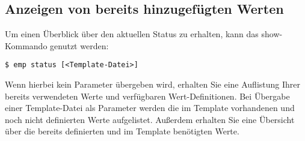 \subsection{Anzeigen von bereits hinzugefügten Werten}
Um einen Überblick über den aktuellen Status zu erhalten, kann das show-Kommando genutzt werden:
\begin{lstlisting}[style=Bash]
$ emp status [<Template-Datei>]
\end{lstlisting}
Wenn hierbei kein Parameter übergeben wird, erhalten Sie eine Auflistung Ihrer bereits verwendeten Werte und verfügbaren Wert-Definitionen.
Bei Übergabe einer Template-Datei als Parameter werden die im Template vorhandenen und noch nicht definierten Werte aufgelistet. Außerdem erhalten Sie eine Übersicht über die bereits definierten und im Template benötigten Werte.
